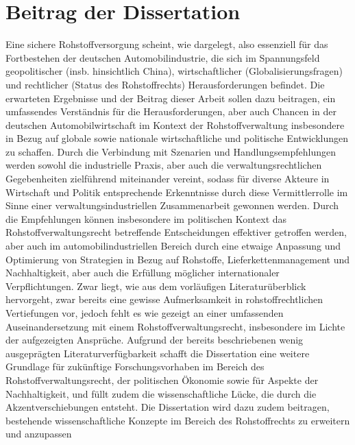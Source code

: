 \documentclass[12pt,a4paper,oneside]{book} %
\begin{document}
\section{Beitrag der Dissertation}
Eine sichere Rohstoffversorgung scheint, wie dargelegt, also essenziell für das Fortbestehen der deutschen Automobilindustrie, die sich im Spannungsfeld geopolitischer (insb. hinsichtlich China), wirtschaftlicher (Globalisierungsfragen) und rechtlicher (Status des Rohstoffrechts) Herausforderungen befindet.
Die erwarteten Ergebnisse und der Beitrag dieser Arbeit sollen dazu beitragen, ein umfassendes Verständnis für die Herausforderungen, aber auch Chancen in der deutschen Automobilwirtschaft im Kontext der Rohstoffverwaltung insbesondere in Bezug auf globale sowie nationale wirtschaftliche und politische Entwicklungen zu schaffen. Durch die Verbindung mit Szenarien und Handlungsempfehlungen werden sowohl die industrielle Praxis, aber auch die verwaltungsrechtlichen Gegebenheiten zielführend miteinander vereint, sodass für diverse Akteure in Wirtschaft und Politik entsprechende Erkenntnisse durch diese Vermittlerrolle im Sinne einer verwaltungsindustriellen Zusammenarbeit gewonnen werden. Durch die Empfehlungen können insbesondere im politischen Kontext das Rohstoffverwaltungsrecht betreffende Entscheidungen effektiver getroffen werden, aber auch im automobilindustriellen Bereich durch eine etwaige Anpassung und Optimierung von Strategien in Bezug auf Rohstoffe, Lieferkettenmanagement und Nachhaltigkeit, aber auch die Erfüllung möglicher internationaler Verpflichtungen. Zwar liegt, wie aus dem vorläufigen Literaturüberblick hervorgeht, zwar bereits eine gewisse Aufmerksamkeit in rohstoffrechtlichen Vertiefungen vor, jedoch fehlt es wie gezeigt an einer umfassenden Auseinandersetzung mit einem Rohstoffverwaltungsrecht, insbesondere im Lichte der aufgezeigten Ansprüche.
Aufgrund der bereits beschriebenen wenig ausgeprägten Literaturverfügbarkeit schafft die Dissertation eine weitere Grundlage für zukünftige Forschungsvorhaben im Bereich des Rohstoffverwaltungsrecht, der politischen Ökonomie sowie für Aspekte der Nachhaltigkeit, und füllt zudem die wissenschaftliche Lücke, die durch die Akzentverschiebungen entsteht. Die Dissertation wird dazu zudem beitragen, bestehende wissenschaftliche Konzepte im Bereich des Rohstoffrechts zu erweitern und anzupassen
\end{document}
